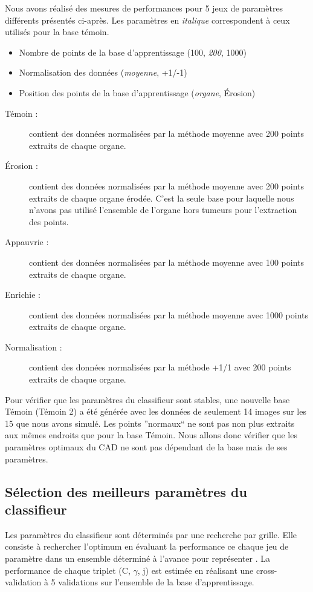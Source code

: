 Nous avons réalisé des mesures de performances pour 5 jeux de paramètres différents présentés ci-après. Les paramètres en \emph{italique} correspondent à ceux utilisés pour la base témoin.


\begin{itemize}
 \item Nombre de points de la base d'apprentissage (100, \emph{200}, 1000)
 \item Normalisation des données (\emph{moyenne}, +1/-1)
 \item Position des points de la base d'apprentissage (\emph{organe}, Érosion)
\end{itemize}


\begin{description}
 \item[Témoin : ] contient des données normalisées par la méthode moyenne avec 200 points extraits de chaque organe.
 \item[Érosion : ] contient des données normalisées par la méthode moyenne avec 200 points extraits de chaque organe érodée. C'est la seule base pour laquelle nous n'avons pas utilisé l'ensemble de l'organe hors tumeurs pour l'extraction des points.
 \item[Appauvrie : ] contient des données normalisées par la méthode moyenne avec 100 points extraits de chaque organe.
 \item[Enrichie : ] contient des données normalisées par la méthode moyenne avec 1000 points extraits de chaque organe.
 \item[Normalisation : ] contient des données normalisées par la méthode +1/1 avec 200 points extraits de chaque organe.
\end{description}

Pour vérifier que les paramètres du classifieur sont stables, une nouvelle base Témoin (Témoin 2) a été générée avec les données de seulement 14 images sur les 15 que nous avons simulé. Les points ''normaux`` ne sont pas non plus extraits aux mêmes endroits que pour la base Témoin. Nous allons donc vérifier que les paramètres optimaux du CAD ne sont pas dépendant de la base mais de ses paramètres.


\subsection{Sélection des meilleurs paramètres du classifieur}

Les paramètres du classifieur sont déterminés par une recherche par grille. Elle consiste à rechercher l'optimum en évaluant la performance ce chaque jeu de paramètre dans un ensemble déterminé à l'avance pour représenter . La performance de chaque triplet (C, $\gamma$, j) est estimée en réalisant une cross-validation à 5 validations sur l'ensemble de la base d'apprentissage.


